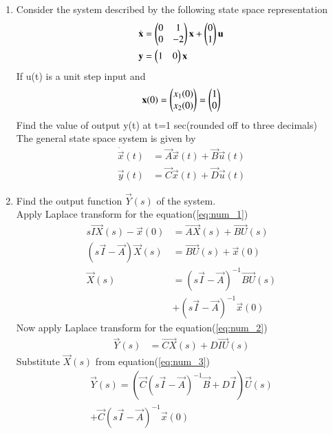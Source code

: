 \begin{enumerate}[label=\thesubsection.\arabic*.,ref=\thesubsection.\theenumi]

\item
Consider the system described by the following state space representation  
\begin{align}
\dot{\mathbf{ x}}&=\begin{pmatrix}0&1\\0&-2\end{pmatrix}\mathbf{x} + \begin{pmatrix}0\\1\end{pmatrix}\mathbf{u}\\  
\mathbf{y} &= \begin{pmatrix}1&0\end{pmatrix}\mathbf{x}
\end{align}
If u(t) is a unit step input and 
\begin{align}
\mathbf{x}(0)=\begin{pmatrix}x_{1}(0)\\x_{2}(0)\end{pmatrix}=\begin{pmatrix}1\\0\end{pmatrix}
\end{align}
Find the value of output y(t) at t=1 sec(rounded off to three decimals)
\\
\solution The general state space system is given by
\begin{align}
\dot{\vec{x}}(t)&=\vec{A}\vec{x}(t)+\vec{B}\vec{u}(t) \label{eq:num_1}\\
 \vec{y}(t)&=\vec{C}\vec{x}(t)+\vec{D} \vec{u}(t) \label{eq:num_2}
\end{align}
\item Find the output function $\vec{Y}(s)$ of the system.
\\
\solution Apply Laplace transform for the equation(\ref{eq:num_1})
\begin{align}
 s\vec{IX}(s)-\vec{x}(0)&= \vec{AX}(s)+ \vec{BU}(s)\\
(s\vec{I}-\vec{A})\vec{X}(s)&= \vec{BU}(s)+ \vec{x}(0)\\
\vec{X}(s)&={(s\vec{I}-\vec{A})^{-1}}\vec{B U}(s)\\ &+(s\vec{I}-\vec{A})^{-1}\vec{x}(0) \label{eq:num_3}
\end{align}
Now apply Laplace transform for the equation(\ref{eq:num_2})
\begin{align}
    \vec{Y}(s)&= \vec{CX}(s)+D\vec{IU}(s)
\end{align}
Substitute $\vec{X}(s)$ from equation(\ref{eq:num_3})
\begin{multline}
\vec{Y}(s)=( \vec{C}{(s\vec{I}-\vec{A})^{-1}}\vec{B}+D\vec{I}) \vec{U}(s) 
\\
+ \vec{C}(s\vec{I}-\vec{A})^{-1}\vec{x}(0) \label{eq:num_4}
\end{multline}


\end{enumerate}
